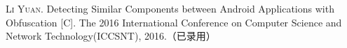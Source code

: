
\begin{publications}{99}
    \item\textsc{Li Yuan}. {Detecting Similar Components between Android Applications with Obfuscation }[C]. The 2016 International Conference on Computer Science and Network Technology(ICCSNT), 2016.（已录用）
 \end{publications}
